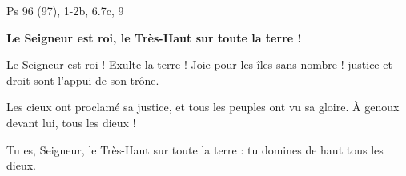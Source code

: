 Ps 96 (97), 1-2b, 6.7c, 9

\textbf{Le Seigneur est roi, le Très-Haut sur toute la terre !}

Le Seigneur est roi ! Exulte la terre !
Joie pour les îles sans nombre !
justice et droit sont l’appui de son trône.

Les cieux ont proclamé sa justice,
et tous les peuples ont vu sa gloire.
À genoux devant lui, tous les dieux !

Tu es, Seigneur, le Très-Haut
sur toute la terre :
tu domines de haut tous les dieux.

